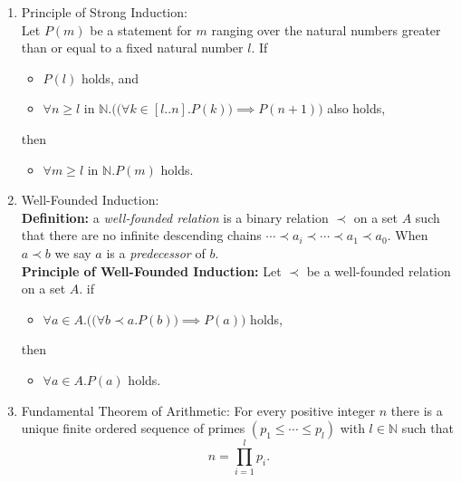 \documentclass{article}
\begin{document}
\begin{enumerate}
    \item Principle of Strong Induction:\\
        Let $P(m)$ be a statement for $m$ ranging over the natural numbers greater than or equal to a fixed natural number $l$. If 
        \begin{itemize}[topsep=0pt]
            \item $P(l)$ holds, and 
            \item $\forall n\geq l\text{ in }\mathbb{N}.\Big(\big(\forall k\in[l..n].P(k)\big)\implies P(n+1)\Big)$ also holds,
        \end{itemize}
        then
        \begin{itemize}[topsep=0pt]
            \item $\forall m\geq l\text{ in }\mathbb{N}.P(m)$ holds.
        \end{itemize}
    \item Well-Founded Induction:\\
        \textbf{Definition:} a \textit{well-founded relation} is a binary relation $\prec$ on a set $A$ such that there are no infinite descending chains $\cdots\prec a_i\prec\cdots\prec a_1\prec a_0$. When $a\prec b$ we say $a$ is a \textit{predecessor} of $b$.\\
        \textbf{Principle of Well-Founded Induction:} Let $\prec$ be a well-founded relation on a set $A$. if
        \begin{itemize}[topsep=0pt]
            \item $\forall a\in A.\Big(\big(\forall b\prec a.P(b)\big)\implies P(a)\Big)$ holds,
        \end{itemize}
        then
        \begin{itemize}[topsep=0pt]
            \item $\forall a\in A.P(a)$ holds.
        \end{itemize}
    \item Fundamental Theorem of Arithmetic: For every positive integer $n$ there is a unique finite ordered sequence of primes $(p_1\leq\cdots\leq p_l)$ with $l\in\mathbb{N}$ such that
        $$n=\displaystyle\prod_{i=1}^{l}p_i.$$
\end{enumerate}
\newpage
\end{document}
